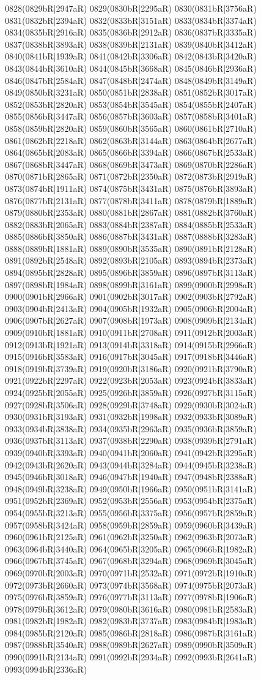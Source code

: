 0828(0829bR|2947aR) 0829(0830bR|2295aR) 0830(0831bR|3756aR) 0831(0832bR|2394aR) 0832(0833bR|3151aR) 0833(0834bR|3374aR) 0834(0835bR|2916aR) 0835(0836bR|2912aR) 0836(0837bR|3335aR) 0837(0838bR|3893aR) 0838(0839bR|2131aR) 0839(0840bR|3412aR) 0840(0841bR|1939aR) 0841(0842bR|3306aR) 0842(0843bR|3420aR) 0843(0844bR|3610aR) 0844(0845bR|3668aR) 0845(0846bR|2936aR) 0846(0847bR|2584aR) 0847(0848bR|2474aR) 0848(0849bR|3149aR) 0849(0850bR|3231aR) 0850(0851bR|2838aR) 0851(0852bR|3017aR) 0852(0853bR|2820aR) 0853(0854bR|3545aR) 0854(0855bR|2407aR) 0855(0856bR|3447aR) 0856(0857bR|3603aR) 0857(0858bR|3401aR) 0858(0859bR|2820aR) 0859(0860bR|3565aR) 0860(0861bR|2710aR) 0861(0862bR|2218aR) 0862(0863bR|3144aR) 0863(0864bR|2677aR) 0864(0865bR|2083aR) 0865(0866bR|3394aR) 0866(0867bR|2533aR) 0867(0868bR|3447aR) 0868(0869bR|3473aR) 0869(0870bR|2286aR) 0870(0871bR|2865aR) 0871(0872bR|2350aR) 0872(0873bR|2919aR) 0873(0874bR|1911aR) 0874(0875bR|3431aR) 0875(0876bR|3893aR) 0876(0877bR|2131aR) 0877(0878bR|3411aR) 0878(0879bR|1889aR) 0879(0880bR|2353aR) 0880(0881bR|2867aR) 0881(0882bR|3760aR) 0882(0883bR|2065aR) 0883(0884bR|2387aR) 0884(0885bR|2533aR) 0885(0886bR|3850aR) 0886(0887bR|3431aR) 0887(0888bR|3283aR) 0888(0889bR|1881aR) 0889(0890bR|3535aR) 0890(0891bR|2128aR) 0891(0892bR|2548aR) 0892(0893bR|2105aR) 0893(0894bR|2373aR) 0894(0895bR|2828aR) 0895(0896bR|3859aR) 0896(0897bR|3113aR) 0897(0898bR|1984aR) 0898(0899bR|3161aR) 0899(0900bR|2998aR) 0900(0901bR|2966aR) 0901(0902bR|3017aR) 0902(0903bR|2792aR) 0903(0904bR|2413aR) 0904(0905bR|1932aR) 0905(0906bR|2004aR) 0906(0907bR|2627aR) 0907(0908bR|1973aR) 0908(0909bR|2134aR) 0909(0910bR|1881aR) 0910(0911bR|2708aR) 0911(0912bR|2003aR) 0912(0913bR|1921aR) 0913(0914bR|3318aR) 0914(0915bR|2966aR) 0915(0916bR|3583aR) 0916(0917bR|3045aR) 0917(0918bR|3446aR) 0918(0919bR|3739aR) 0919(0920bR|3186aR) 0920(0921bR|3790aR) 0921(0922bR|2297aR) 0922(0923bR|2053aR) 0923(0924bR|3833aR) 0924(0925bR|2055aR) 0925(0926bR|3859aR) 0926(0927bR|3115aR) 0927(0928bR|3506aR) 0928(0929bR|3748aR) 0929(0930bR|3024aR) 0930(0931bR|3193aR) 0931(0932bR|1998aR) 0932(0933bR|3089aR) 0933(0934bR|3838aR) 0934(0935bR|2963aR) 0935(0936bR|3859aR) 0936(0937bR|3113aR) 0937(0938bR|2290aR) 0938(0939bR|2791aR) 0939(0940bR|3393aR) 0940(0941bR|2060aR) 0941(0942bR|3295aR) 0942(0943bR|2620aR) 0943(0944bR|3284aR) 0944(0945bR|3238aR) 0945(0946bR|3018aR) 0946(0947bR|1940aR) 0947(0948bR|2388aR) 0948(0949bR|3238aR) 0949(0950bR|1966aR) 0950(0951bR|3141aR) 0951(0952bR|2369aR) 0952(0953bR|2556aR) 0953(0954bR|2375aR) 0954(0955bR|3213aR) 0955(0956bR|3375aR) 0956(0957bR|2859aR) 0957(0958bR|3424aR) 0958(0959bR|2859aR) 0959(0960bR|3439aR) 0960(0961bR|2125aR) 0961(0962bR|3250aR) 0962(0963bR|2073aR) 0963(0964bR|3440aR) 0964(0965bR|3205aR) 0965(0966bR|1982aR) 0966(0967bR|3745aR) 0967(0968bR|3294aR) 0968(0969bR|3045aR) 0969(0970bR|2003aR) 0970(0971bR|2532aR) 0971(0972bR|1910aR) 0972(0973bR|2660aR) 0973(0974bR|3568aR) 0974(0975bR|2073aR) 0975(0976bR|3859aR) 0976(0977bR|3113aR) 0977(0978bR|1906aR) 0978(0979bR|3612aR) 0979(0980bR|3616aR) 0980(0981bR|2583aR) 0981(0982bR|1982aR) 0982(0983bR|3737aR) 0983(0984bR|1983aR) 0984(0985bR|2120aR) 0985(0986bR|2818aR) 0986(0987bR|3161aR) 0987(0988bR|3540aR) 0988(0989bR|2627aR) 0989(0990bR|3509aR) 0990(0991bR|2134aR) 0991(0992bR|2934aR) 0992(0993bR|2641aR) 0993(0994bR|2336aR) 